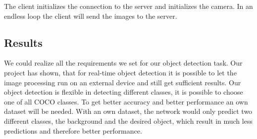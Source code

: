 The client initializes the connection to the server and initializes the camera. In an endless loop the client will send the images to the server.

\subsection{Results}

We could realize all the requirements we set for our object detection task. Our project has shown, that for real-time object detection it is possible to let the image processing run on an external device and still get sufficient results. Our object detection is flexible in detecting different classes, it is possible to choose one of all COCO classes. To get better accuracy and better performance an own dataset will be needed. With an own dataset, the network would only predict two different classes, the background and the desired object, which result in much less predictions and therefore better performance.
